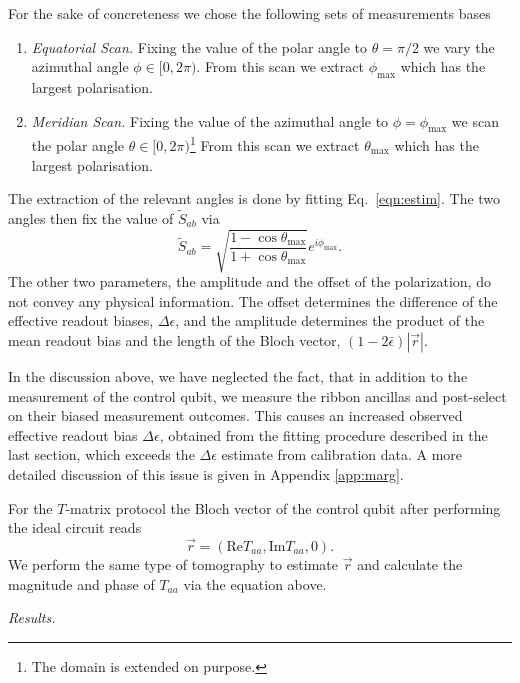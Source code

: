 \documentclass[two column]{article}
\begin{document}
For the sake of concreteness we chose the following sets of measurements bases  \begin{enumerate}
    \item \emph{Equatorial Scan.} Fixing the value of the polar angle to $\theta = \pi/2$ we vary the azimuthal angle $\phi \in [0, 2\pi)$. From this scan we extract $\phi_{\text{max}}$ which has the largest polarisation.
    \item \emph{Meridian Scan.} Fixing the value of the azimuthal angle to $\phi = \phi_{\text{max}}$ we scan the polar angle $\theta \in [0, 2\pi)$\footnote{The domain is extended on purpose.} From this scan we extract $\theta_{\text{max}}$ which has the largest polarisation.
\end{enumerate}
The extraction of the relevant angles is done by fitting Eq.~\eqref{eqn:estim}.
The two angles then fix the value of $\tilde{S}_{ab}$ via $$\tilde{S}_{ab} = \sqrt{\frac{1-\cos{\theta_{\text{max}}}}{1+\cos{\theta_{\text{max}}}}}e^{i\phi_{\text{max}}}.$$
The other two parameters, the amplitude and the offset of the polarization, do not convey any physical information. The offset determines the difference of the effective readout biases, $\Delta\epsilon$, and the amplitude determines the product of the mean readout bias and the length of the Bloch vector, $(1-2\bar{\epsilon})|\vec{r}|$.


In the discussion above, we have neglected the fact, that in addition to the measurement of the control qubit, we measure the ribbon ancillas and post-select on their biased measurement outcomes. This causes an increased observed effective readout bias $\Delta \epsilon$, obtained from the fitting procedure described in the last section, which exceeds the $\Delta \epsilon$ estimate from calibration data. A more detailed discussion of this issue is given in Appendix \ref{app:marg}. 


For the $T$-matrix protocol the Bloch vector of the control qubit after performing the ideal circuit reads
\begin{equation}
    \vec{r} = \left(  \text{Re}{T}_{aa}, \text{Im}{T}_{aa}, 0 \right).\label{eqn:blochT} 
\end{equation}
We perform the same type of tomography to estimate $\vec r$ and calculate the magnitude and phase of $T_{aa}$ via the equation above.




\emph{Results.}
\end{document}
